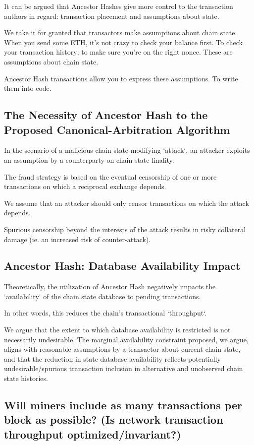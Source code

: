 \documentclass[11pt]{article}
\theoremstyle{plain}
\begin{document}
It can be argued that Ancestor Hashes give more control to the transaction
authors in regard: transaction placement and assumptions about state.

We take it for granted that transactors make assumptions about chain state.
When you send some ETH, it's not crazy to check your balance first. To check
your transaction history; to make sure you're on the right nonce.
These are assumptions about chain state. 

Ancestor Hash transactions allow you to express these assumptions. To write
them into code.

\subsection{\small{The Necessity of Ancestor Hash to the Proposed
Canonical-Arbitration Algorithm}}

In the scenario of a malicious chain state-modifying `attack`, an attacker
exploits an assumption by a counterparty on chain state finality.

The fraud strategy is based on the eventual censorship of one or more
transactions on which a reciprocal exchange depends.

We assume that an attacker should only censor transactions on which the attack
depends.

Spurious censorship beyond the interests of the attack results in risky
collateral damage (ie. an increased risk of counter-attack).


\subsection{\small{Ancestor Hash: Database Availability Impact}}

Theoretically, the utilization of Ancestor Hash negatively impacts the
`availability` of the chain state database to pending transactions.

In other words, this reduces the chain's transactional `throughput`.

We argue that the extent to which database availability is restricted is not
necessarily undesirable.
The marginal availability constraint proposed, we argue, aligns with reasonable
assumptions by a transactor about current chain state,
and that the reduction in state database availability reflects potentially
undesirable/spurious transaction inclusion in alternative
and unobserved chain state histories.

\subsection{\small{Will miners include as many transactions per block as
possible? (Is network transaction throughput optimized/invariant?)}}
\end{document}
